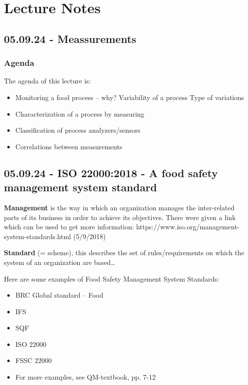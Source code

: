 \chapter{Lecture Notes}

\section{05.09.24 - Meassurements}

\subsection{Agenda}
The agenda of this lecture is:
\begin{highlight}
    \begin{itemize}
        \item Monitoring a food process – why?
        \subitem * Variability of a process
        \subitem * Type of variations
        \item Characterization of a process by measuring
        \item Classification of process analyzers/sensors
        \item Correlations between measurements
    \end{itemize}
\end{highlight}


\section{05.09.24 - ISO 22000:2018 - A food safety management system standard}


\textbf{Management} is the way in which an organization manages the inter-related parts of its business in order to achieve its objectives.
There were given a link which can be used to get more information:
https://www.iso.org/management-system-standards.html
(5/9/2018)

\textbf{Standard} (= scheme), this describes the set of rules/requirements on which the system of an organization are based…

Here are some examples of Food Safety Management System Standards:
\begin{highlight}
    \begin{itemize}
        \item BRC Global standard – Food
        \item IFS
        \item SQF
        \item ISO 22000
        \item FSSC 22000
        \item For more examples, see QM-textbook, pp. 7-12
    \end{itemize}
\end{highlight}

